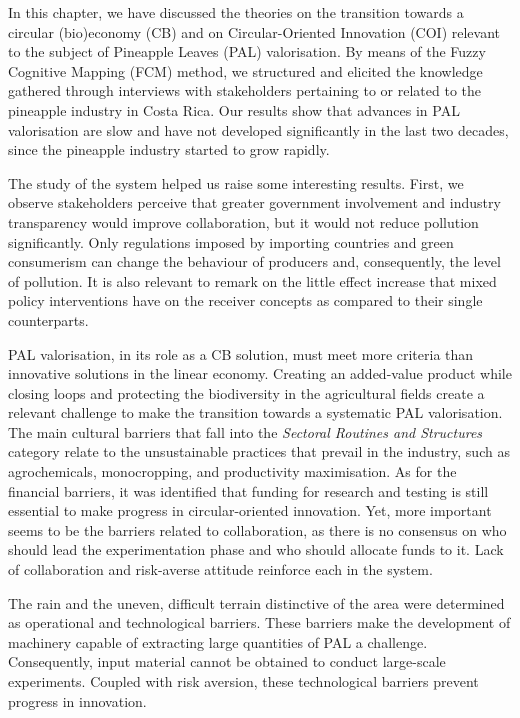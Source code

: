 In this chapter, we have discussed the theories on the transition towards a circular (bio)economy (CB) and on Circular-Oriented Innovation (COI) relevant to the subject of Pineapple Leaves (PAL) valorisation. By means of the Fuzzy Cognitive Mapping (FCM) method, we structured and elicited the knowledge gathered through interviews with stakeholders pertaining to or related to the pineapple industry in Costa Rica. Our results show that advances in PAL valorisation are slow and have not developed significantly in the last two decades, since the pineapple industry started to grow rapidly. 

The study of the system helped us raise some interesting results. First, we observe stakeholders perceive that greater government involvement and industry transparency would improve collaboration, but it would not reduce pollution significantly. Only regulations imposed by importing countries and green consumerism can change the behaviour of producers and, consequently, the level of pollution. It is also relevant to remark on the little effect increase that mixed policy interventions have on the receiver concepts as compared to their single counterparts.

PAL valorisation, in its role as a CB solution, must meet more criteria than innovative solutions in the linear economy. Creating an added-value product while closing loops and protecting the biodiversity in the agricultural fields create a relevant challenge to make the transition towards a systematic PAL valorisation. The main cultural barriers that fall into the \textit{Sectoral Routines and Structures} category relate to the unsustainable practices that prevail in the industry, such as agrochemicals, monocropping, and productivity maximisation. As for the financial barriers, it was identified that funding for research and testing is still essential to make progress in circular-oriented innovation. Yet, more important seems to be the barriers related to collaboration, as there is no consensus on who should lead the experimentation phase and who should allocate funds to it. Lack of collaboration and risk-averse attitude reinforce each in the system.

The rain and the uneven, difficult terrain distinctive of the area were determined as operational and technological barriers. These barriers make the development of machinery capable of extracting large quantities of PAL a challenge. Consequently, input material cannot be obtained to conduct large-scale experiments. Coupled with risk aversion, these technological barriers prevent progress in innovation. 


